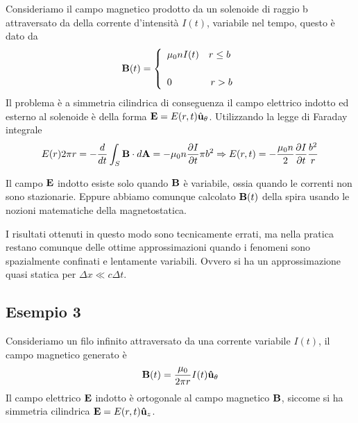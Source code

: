 Consideriamo il campo magnetico prodotto da un solenoide di raggio b attraversato da della corrente d'intensit\`a $I(t)$, variabile nel tempo,  questo \`e dato da 
\begin{equation*}
	\bold{B}(t) = \left \{\begin{array}{l}
		\mu_0 n I(t) \quad r \leq b \\ \rule{0pt}{25pt}
		0 \quad \quad \quad \quad r > b
	\end{array}\right.
\end{equation*}
Il problema \`e a simmetria cilindrica di conseguenza il campo elettrico  indotto ed esterno al solenoide \`e della forma $\bold{E} = E(r,t) \hat{\bold{u}}_{\theta}$. Utilizzando la legge di Faraday integrale 
\begin{equation*}
	E(r) 2 \pi r = - \frac{d}{dt} \int_{S} \bold{B} \cdot d\bold{A} = - \mu_0 n \frac{\partial I}{\partial t} \pi b^2 \Rightarrow E(r,t) = - \frac{\mu_0 n }{2} \frac{\partial I}{\partial t} \frac{b^2}{r}
\end{equation*}

\begin{remark}
	Il campo $\bold{E}$ indotto esiste solo quando $\bold{B}$ \`e variabile, ossia quando le correnti non sono stazionarie. Eppure abbiamo comunque calcolato $\bold{B}(t)$ della spira usando le nozioni matematiche della magnetostatica. 
	
	I risultati ottenuti in questo modo sono tecnicamente errati, ma nella pratica restano comunque delle ottime approssimazioni quando i fenomeni sono spazialmente confinati e lentamente variabili. Ovvero si ha un approssimazione quasi statica per $\Delta x \ll c \Delta t$.
\end{remark}

\subsection{Esempio 3}


Consideriamo un filo infinito attraversato da una corrente variabile $I(t)$, il campo magnetico generato \`e
\begin{equation*}
	\bold{B}(t) = \frac{\mu_0}{2 \pi r} I(t) \bold{\hat{u}}_{\theta}
\end{equation*}
Il campo elettrico $\bold{E}$ indotto \`e ortogonale al campo magnetico $\bold{B}$, siccome si ha simmetria cilindrica $\bold{E} = E(r,t) \bold{\hat{u}}_z$.

